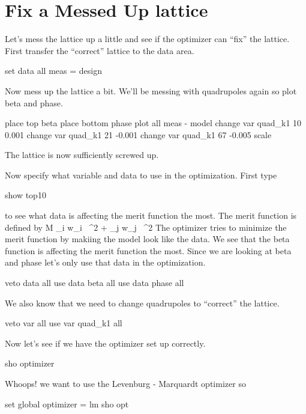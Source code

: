 \documentclass{report}
\begin{document}
\section{Fix a Messed Up lattice}
\label{s:fix_it}

Let's mess the lattice up a little and see if the optimizer can ``fix'' the
lattice. First transfer the ``correct'' lattice to the  data area.
\begin{example}
  set data all meas = design
\end{example}
Now mess up the lattice a bit. We'll be messing with quadrupoles again so plot
beta and phase.
\begin{example}
  place top beta
  place bottom phase
  plot all meas - model
  change var quad\_k1 10 0.001
  change var quad\_k1 21 -0.001
  change var quad\_k1 67 -0.005
  scale
\end{example}
The lattice is now sufficiently screwed up.

Now specify what variable and data to use in the optimization. First type
\begin{example}
  show top10
\end{example}
to see what data is affecting the merit function the most. The merit function is
defined by
\Begineq
  {\cal M} \equiv \sum\_{i} w\_i \,
    ^2 + 
  \sum\_{j} w\_j \,
    ^2
  \label{m1}
\Endeq
The optimizer tries to minimize the merit function by makiing the model look
like the data. We see that the beta function is affecting the merit function the most. Since we
are looking at beta and phase let's only use that data in the optimization.
\begin{example}
  veto data all
  use  data beta all
  use  data phase all
\end{example}
We also know that we need to change quadrupoles to ``correct'' the lattice.
\begin{example}
  veto var all
  use var quad\_k1 all
\end{example}
Now let's see if we have the optimizer set up correctly.
\begin{example}
  sho optimizer
\end{example}
Whoops! we want to use the Levenburg - Marquardt optimizer so
\begin{example}
  set global optimizer = lm
  sho opt
\end{example}
\end{document}

